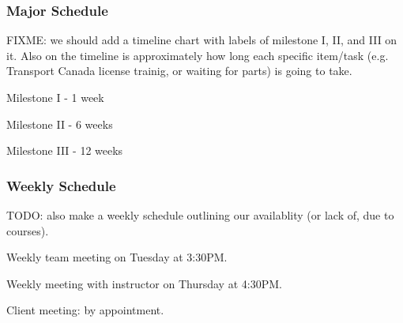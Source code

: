 \subsubsection{Major Schedule}

FIXME: we should add a timeline chart with labels of milestone I, II, and III
on it. Also on the timeline is approximately how long each specific 
item/task (e.g. Transport Canada license trainig, or waiting for parts) is going
to take.

Milestone I - 1 week

Milestone II - 6 weeks

Milestone III - 12 weeks


\subsubsection{Weekly Schedule}

TODO: also make a weekly schedule outlining our availablity (or lack of, due
to courses).

Weekly team meeting on Tuesday at 3:30PM.

Weekly meeting with instructor on Thursday at 4:30PM.

Client meeting: by appointment.